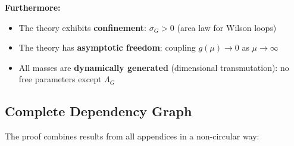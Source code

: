 \begin{theorem}
\textbf{Furthermore:}
\begin{itemize}
\item The theory exhibits \textbf{confinement}: $\sigma_G > 0$ (area law for Wilson loops)
\item The theory has \textbf{asymptotic freedom}: coupling $g(\mu) \to 0$ as $\mu \to \infty$
\item All masses are \textbf{dynamically generated} (dimensional transmutation): no free parameters except $\Lambda_G$
\end{itemize}
\end{theorem}

\subsection{Complete Dependency Graph}

The proof combines results from all appendices in a non-circular way:

